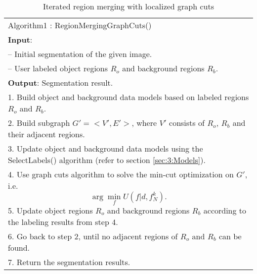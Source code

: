     \begin{table}
    \caption{Iterated region merging with localized graph cuts}\label{IGC:Tab:algorithm}
    \begin{tabular}{p{14cm}}
     \hline
    Algorithm1 : RegionMergingGraphCuts()\\
    \textbf{Input}:\\
    -- Initial segmentation of the given image.\\
    -- User labeled object regions $R_o$ and background regions $R_b$.\\
    \textbf{Output}: Segmentation result.\\
     \hline
     1. Build object and background data models based on labeled regions $R_o$ and $R_b$.\\
     2. Build subgraph $G'=<V',E'>$, where $V'$ consists of $R_o$, $R_b$ and their adjacent regions.\\
     3. Update object and background data models using the SelectLabels() algorithm (refer to section
     \ref{sec:3:Models}).\\
     4. Use graph cuts algorithm to solve the min-cut optimization on $G'$, i.e.
     \begin{displaymath}
     \arg\min_{f}U(f|d,f_{N}^{k}).
     \end{displaymath}
     5. Update object regions $R_o$ and background regions $R_b$ according to the labeling results from step 4. \\
     6. Go back to step 2, until no adjacent regions of $R_o$ and $R_b$ can be found. \\
     7. Return the segmentation results.\\
     \hline
   \end{tabular}
   \end{table}

